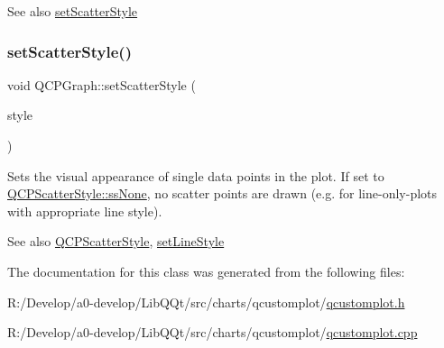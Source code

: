 \begin{DoxySeeAlso}{See also}
\mbox{\hyperlink{class_q_c_p_graph_a12bd17a8ba21983163ec5d8f42a9fea5}{set\+Scatter\+Style}} 
\end{DoxySeeAlso}
\mbox{\label{class_q_c_p_graph_a12bd17a8ba21983163ec5d8f42a9fea5}} 
\subsubsection{\texorpdfstring{set\+Scatter\+Style()}{setScatterStyle()}}
{\footnotesize\ttfamily void Q\+C\+P\+Graph\+::set\+Scatter\+Style (\begin{DoxyParamCaption}\item[{const \mbox{\hyperlink{class_q_c_p_scatter_style}{Q\+C\+P\+Scatter\+Style}} \&}]{style }\end{DoxyParamCaption})}

Sets the visual appearance of single data points in the plot. If set to \mbox{\hyperlink{class_q_c_p_scatter_style_adb31525af6b680e6f1b7472e43859349abd144c291ca274f77053ec68cab6c022}{Q\+C\+P\+Scatter\+Style\+::ss\+None}}, no scatter points are drawn (e.\+g. for line-\/only-\/plots with appropriate line style).

\begin{DoxySeeAlso}{See also}
\mbox{\hyperlink{class_q_c_p_scatter_style}{Q\+C\+P\+Scatter\+Style}}, \mbox{\hyperlink{class_q_c_p_graph_a513fecccff5b2a50ce53f665338c60ff}{set\+Line\+Style}} 
\end{DoxySeeAlso}


The documentation for this class was generated from the following files\+:\begin{DoxyCompactItemize}
\item 
R\+:/\+Develop/a0-\/develop/\+Lib\+Q\+Qt/src/charts/qcustomplot/\mbox{\hyperlink{qcustomplot_8h}{qcustomplot.\+h}}\item 
R\+:/\+Develop/a0-\/develop/\+Lib\+Q\+Qt/src/charts/qcustomplot/\mbox{\hyperlink{qcustomplot_8cpp}{qcustomplot.\+cpp}}\end{DoxyCompactItemize}
